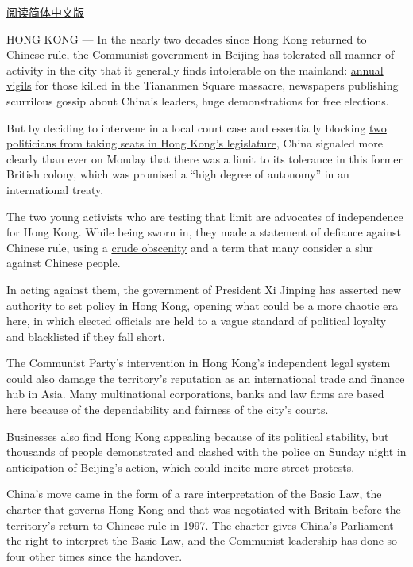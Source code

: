 \href{http://cn.nytimes3xbfgragh.onion/china/20161107/cc07npc-hk/}{阅读简体中文版}

HONG KONG --- In the nearly two decades since Hong Kong returned to
Chinese rule, the Communist government in Beijing has tolerated all
manner of activity in the city that it generally finds intolerable on
the mainland:
\href{http://www.nytimes3xbfgragh.onion/2016/06/05/world/asia/hong-kong-mark-tiananmen-square-anniversary.html?_r=0}{annual
vigils} for those killed in the Tiananmen Square massacre, newspapers
publishing scurrilous gossip about China's leaders, huge demonstrations
for free elections.

But by deciding to intervene in a local court case and essentially
blocking
\href{http://www.nytimes3xbfgragh.onion/2016/11/05/world/asia/china-hong-kong-leung-yau-dispute.html}{two
politicians from taking seats in Hong Kong's legislature}, China
signaled more clearly than ever on Monday that there was a limit to its
tolerance in this former British colony, which was promised a ``high
degree of autonomy'' in an international treaty.

The two young activists who are testing that limit are advocates of
independence for Hong Kong. While being sworn in, they made a statement
of defiance against Chinese rule, using a
\href{http://www.nytimes3xbfgragh.onion/2016/10/13/world/asia/hong-kong-legislative-council.html}{crude
obscenity} and a term that many consider a slur against Chinese people.

In acting against them, the government of President Xi Jinping has
asserted new authority to set policy in Hong Kong, opening what could be
a more chaotic era here, in which elected officials are held to a vague
standard of political loyalty and blacklisted if they fall short.

The Communist Party's intervention in Hong Kong's independent legal
system could also damage the territory's reputation as an international
trade and finance hub in Asia. Many multinational corporations, banks
and law firms are based here because of the dependability and fairness
of the city's courts.

Businesses also find Hong Kong appealing because of its political
stability, but thousands of people demonstrated and clashed with the
police on Sunday night in anticipation of Beijing's action, which could
incite more street protests.

China's move came in the form of a rare interpretation of the Basic Law,
the charter that governs Hong Kong and that was negotiated with Britain
before the territory's
\href{http://www.nytimes3xbfgragh.onion/learning/general/onthisday/big/0630.html}{return
to Chinese rule} in 1997. The charter gives China's Parliament the right
to interpret the Basic Law, and the Communist leadership has done so
four other times since the handover.

